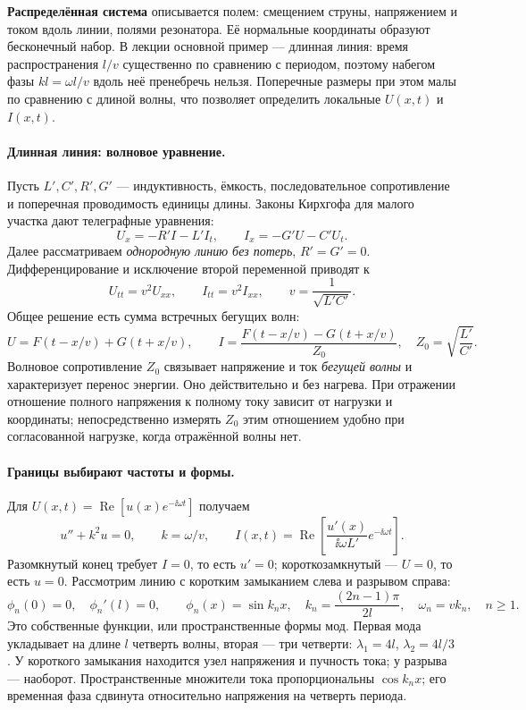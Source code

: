 \textbf{Распределённая система} описывается полем: смещением струны, напряжением и током вдоль линии, полями резонатора. Её нормальные координаты образуют бесконечный набор. В лекции основной пример --- длинная линия: время распространения $l/v$ существенно по сравнению с периодом, поэтому набегом фазы $kl=\omega l/v$ вдоль неё пренебречь нельзя. Поперечные размеры при этом малы по сравнению с длиной волны, что позволяет определить локальные $U(x,t)$ и $I(x,t)$.

\paragraph{Длинная линия: волновое уравнение.}
Пусть $L',C',R',G'$ --- индуктивность, ёмкость, последовательное сопротивление и поперечная проводимость единицы длины. Законы Кирхгофа для малого участка дают телеграфные уравнения:
\begin{equation}
 U_x=-R'I-L'I_t,\qquad I_x=-G'U-C'U_t.
\end{equation}
Далее рассматриваем \emph{однородную линию без потерь}, $R'=G'=0$. Дифференцирование и исключение второй переменной приводят к
\begin{equation}
 U_{tt}=v^2U_{xx},\qquad I_{tt}=v^2I_{xx},\qquad
 v=\frac1{\sqrt{L'C'}}.
\end{equation}
Общее решение есть сумма встречных бегущих волн:
\[
 U=F(t-x/v)+G(t+x/v),\qquad
 I=\frac{F(t-x/v)-G(t+x/v)}{Z_0},\quad
 Z_0=\sqrt{\frac{L'}{C'}}.
\]
Волновое сопротивление $Z_0$ связывает напряжение и ток \emph{бегущей волны} и характеризует перенос энергии. Оно действительно и без нагрева. При отражении отношение полного напряжения к полному току зависит от нагрузки и координаты; непосредственно измерять $Z_0$ этим отношением удобно при согласованной нагрузке, когда отражённой волны нет.

\paragraph{Границы выбирают частоты и формы.}
Для $U(x,t)=\operatorname{Re}[u(x)e^{-\ii\omega t}]$ получаем
\[
 u''+k^2u=0,\qquad k=\omega/v,\qquad
 I(x,t)=\operatorname{Re}\!\left[\frac{u'(x)}{\ii\omega L'}e^{-\ii\omega t}\right].
\]
Разомкнутый конец требует $I=0$, то есть $u'=0$; короткозамкнутый --- $U=0$, то есть $u=0$. Рассмотрим линию с коротким замыканием слева и разрывом справа:
\begin{equation}\label{eq:distributedmodes}
 \phi_n(0)=0,\quad \phi_n'(l)=0,\qquad
 \phi_n(x)=\sin k_nx,\quad k_n=\frac{(2n-1)\pi}{2l},\quad
 \omega_n=vk_n,\quad n\geq1.
\end{equation}
Это собственные функции, или пространственные формы мод. Первая мода укладывает на длине $l$ четверть волны, вторая --- три четверти: $\lambda_1=4l$, $\lambda_2=4l/3$. У короткого замыкания находится узел напряжения и пучность тока; у разрыва --- наоборот. Пространственные множители тока пропорциональны $\cos k_nx$; его временная фаза сдвинута относительно напряжения на четверть периода.

